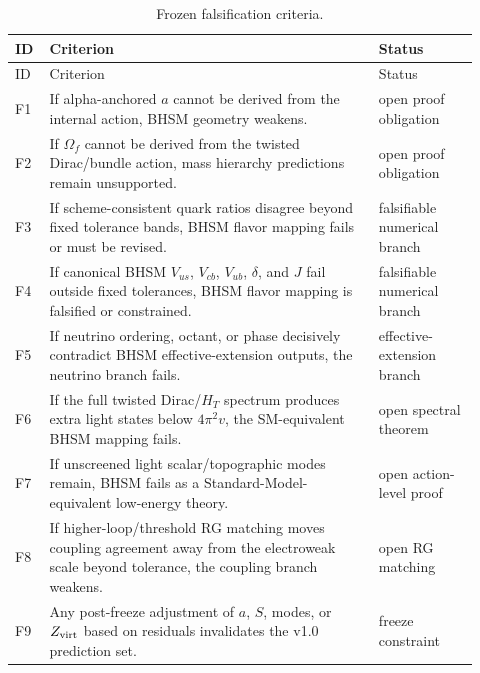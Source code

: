 \documentclass[11pt]{article}
\newcommand{\BHSM}{BHSM}
\newcommand{\HT}{\ensuremath{H_T}}
\begin{document}
\begingroup
\small
\begin{longtable}{@{}L{0.06\linewidth}L{0.66\linewidth}L{0.20\linewidth}@{}}
\caption{Frozen falsification criteria.}\\
\toprule
ID & Criterion & Status \\
\midrule
\endfirsthead
\toprule
ID & Criterion & Status \\
\midrule
\endhead
F1 & If alpha-anchored $a$ cannot be derived from the internal action, \BHSM{} geometry weakens. & open proof obligation \\
F2 & If $\Omega_f$ cannot be derived from the twisted Dirac/bundle action, mass hierarchy predictions remain unsupported. & open proof obligation \\
F3 & If scheme-consistent quark ratios disagree beyond fixed tolerance bands, \BHSM{} flavor mapping fails or must be revised. & falsifiable numerical branch \\
F4 & If canonical \BHSM{} $V_{us}$, $V_{cb}$, $V_{ub}$, $\delta$, and $J$ fail outside fixed tolerances, \BHSM{} flavor mapping is falsified or constrained. & falsifiable numerical branch \\
F5 & If neutrino ordering, octant, or phase decisively contradict \BHSM{} effective-extension outputs, the neutrino branch fails. & effective-extension branch \\
F6 & If the full twisted Dirac/\HT{} spectrum produces extra light states below $4\pi^2v$, the SM-equivalent \BHSM{} mapping fails. & open spectral theorem \\
F7 & If unscreened light scalar/topographic modes remain, \BHSM{} fails as a Standard-Model-equivalent low-energy theory. & open action-level proof \\
F8 & If higher-loop/threshold RG matching moves coupling agreement away from the electroweak scale beyond tolerance, the coupling branch weakens. & open RG matching \\
F9 & Any post-freeze adjustment of $a$, $S$, modes, or $Z_{\rm virt}$ based on residuals invalidates the v1.0 prediction set. & freeze constraint \\
\bottomrule
\end{longtable}
\endgroup
\end{document}
